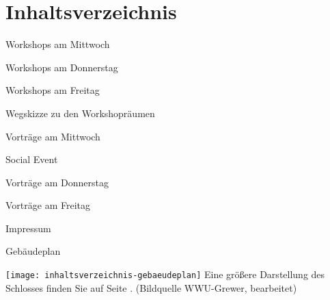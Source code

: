 \section*{Inhaltsverzeichnis}
\label{inhaltsverzeichnis}

\vspace*{0.35em}%
\noindent Workshops am Mittwoch \dotfill \pageref{mittwoch-workshops}

\vspace*{0.35em}%
\noindent Workshops am Donnerstag \dotfill \pageref{donnerstag-workshops}

\vspace*{0.35em}%
\noindent Workshops am Freitag \dotfill \pageref{freitag-workshops}

\vspace*{0.35em}%
\noindent Wegskizze zu den Workshopräumen \dotfill \pageref{karte}

\vspace*{0.35em}%
\noindent Vorträge am Mittwoch \dotfill \pageref{mittwoch}

\vspace*{0.35em}%
\noindent Social Event \dotfill \pageref{social-event}

\vspace*{0.35em}%
\noindent Vorträge am Donnerstag \dotfill \pageref{donnerstag}

\vspace*{0.35em}%
\noindent Vorträge am Freitag \dotfill \pageref{freitag}

\vspace*{0.35em}%
\noindent Impressum \dotfill \pageref{impressum}

\vspace*{0.35em}%
\noindent Gebäudeplan \dotfill \pageref{gebaeudeplan}

\begin{center}
	\texttt{[image: inhaltsverzeichnis-gebaeudeplan]}
\noindent Eine größere Darstellung des Schlosses finden Sie auf Seite \pageref{gebaeudeplan}.
{\small(Bildquelle WWU-Grewer, bearbeitet) }
\end{center}